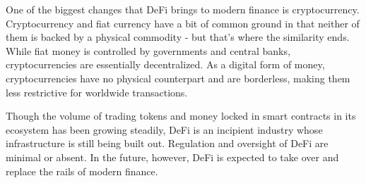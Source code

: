 One of the biggest changes that DeFi brings to modern finance is cryptocurrency. Cryptocurrency and fiat currency have a bit of common ground in that neither of them is backed by a physical commodity - but that’s where the similarity ends. While fiat money is controlled by governments and central banks, cryptocurrencies are essentially decentralized. As a digital form of money, cryptocurrencies have no physical counterpart and are borderless, making them less restrictive for worldwide transactions.

Though the volume of trading tokens and money locked in smart contracts in its ecosystem has been growing steadily, DeFi is an incipient industry whose infrastructure is still being built out. Regulation and oversight of DeFi are minimal or absent. In the future, however, DeFi is expected to take over and replace the rails of modern finance.

\cleardoublepage